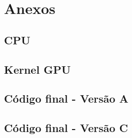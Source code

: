 \renewcommand{\thechapter}{\Alph{chapter}}
\renewcommand{\thesection}{\Alph{chapter}.\arabic{section}}
\setcounter{chapter}{0}
\chapter{Anexos}
\section{CPU}

\newpage

\section{Kernel GPU}
\label{secA:kernel}

\newpage

\section{Código final - Versão A}

\section{Código final - Versão C}


